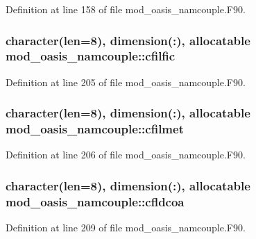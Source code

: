 Definition at line 158 of file mod\+\_\+oasis\+\_\+namcouple.\+F90.

\hypertarget{classmod__oasis__namcouple_a6a69d927924d3fa391fdc3ec6cb78197}{
\subsubsection[{cfilfic}]{\setlength{\rightskip}{0pt plus 5cm}character(len=8), dimension(\+:), allocatable mod\+\_\+oasis\+\_\+namcouple\+::cfilfic\hspace{0.3cm}{\ttfamily [private]}}}\label{classmod__oasis__namcouple_a6a69d927924d3fa391fdc3ec6cb78197}


Definition at line 205 of file mod\+\_\+oasis\+\_\+namcouple.\+F90.

\hypertarget{classmod__oasis__namcouple_adf402f22f61893178fadcefe43b91102}{
\subsubsection[{cfilmet}]{\setlength{\rightskip}{0pt plus 5cm}character(len=8), dimension(\+:), allocatable mod\+\_\+oasis\+\_\+namcouple\+::cfilmet\hspace{0.3cm}{\ttfamily [private]}}}\label{classmod__oasis__namcouple_adf402f22f61893178fadcefe43b91102}


Definition at line 206 of file mod\+\_\+oasis\+\_\+namcouple.\+F90.

\hypertarget{classmod__oasis__namcouple_af3a308fee2e4b00a1380035e41113d36}{
\subsubsection[{cfldcoa}]{\setlength{\rightskip}{0pt plus 5cm}character(len=8), dimension(\+:), allocatable mod\+\_\+oasis\+\_\+namcouple\+::cfldcoa\hspace{0.3cm}{\ttfamily [private]}}}\label{classmod__oasis__namcouple_af3a308fee2e4b00a1380035e41113d36}


Definition at line 209 of file mod\+\_\+oasis\+\_\+namcouple.\+F90.

